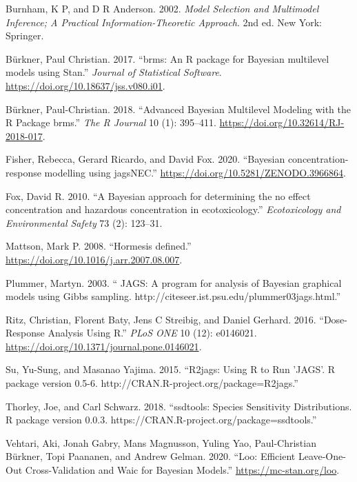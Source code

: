 \documentclass[10pt,a4paper,onecolumn]{article}
\newlength{\cslhangindent}
\newenvironment{cslreferences}%
  {\setlength{\parindent}{0pt}%
  \everypar{\setlength{\hangindent}{\cslhangindent}}\ignorespaces}%
  {\par}
\begin{document}
\hypertarget{refs}{}
\begin{cslreferences}
\leavevmode\hypertarget{ref-Burnham2002}{}%
Burnham, K P, and D R Anderson. 2002. \emph{Model Selection and
Multimodel Inference; A Practical Information-Theoretic Approach}. 2nd
ed. New York: Springer.

\leavevmode\hypertarget{ref-Burkner2017}{}%
Bürkner, Paul Christian. 2017. ``brms: An R package for Bayesian
multilevel models using Stan.'' \emph{Journal of Statistical Software}.
\url{https://doi.org/10.18637/jss.v080.i01}.

\leavevmode\hypertarget{ref-Burkner2018}{}%
Bürkner, Paul-Christian. 2018. ``Advanced Bayesian Multilevel Modeling
with the R Package brms.'' \emph{The R Journal} 10 (1): 395--411.
\url{https://doi.org/10.32614/RJ-2018-017}.

\leavevmode\hypertarget{ref-Fisher2020}{}%
Fisher, Rebecca, Gerard Ricardo, and David Fox. 2020. ``Bayesian
concentration-response modelling using jagsNEC.''
\url{https://doi.org/10.5281/ZENODO.3966864}.

\leavevmode\hypertarget{ref-Fox2010}{}%
Fox, David R. 2010. ``A Bayesian approach for determining the no effect
concentration and hazardous concentration in ecotoxicology.''
\emph{Ecotoxicology and Environmental Safety} 73 (2): 123--31.

\leavevmode\hypertarget{ref-Mattson2008}{}%
Mattson, Mark P. 2008. ``Hormesis defined.''
\url{https://doi.org/10.1016/j.arr.2007.08.007}.

\leavevmode\hypertarget{ref-Plummer2003}{}%
Plummer, Martyn. 2003. `` JAGS: A program for analysis of Bayesian
graphical models using Gibbs sampling.
http://citeseer.ist.psu.edu/plummer03jags.html.''

\leavevmode\hypertarget{ref-Ritz2016}{}%
Ritz, Christian, Florent Baty, Jens C Streibig, and Daniel Gerhard.
2016. ``Dose-Response Analysis Using R.'' \emph{PLoS ONE} 10 (12):
e0146021. \url{https://doi.org/10.1371/journal.pone.0146021}.

\leavevmode\hypertarget{ref-Su2015}{}%
Su, Yu-Sung, and Masanao Yajima. 2015. ``R2jags: Using R to Run 'JAGS'.
R package version 0.5-6. http://CRAN.R-project.org/package=R2jags.''

\leavevmode\hypertarget{ref-Thorley2018}{}%
Thorley, Joe, and Carl Schwarz. 2018. ``ssdtools: Species Sensitivity
Distributions. R package version 0.0.3.
https://CRAN.R-project.org/package=ssdtools.''

\leavevmode\hypertarget{ref-vehtari2020}{}%
Vehtari, Aki, Jonah Gabry, Mans Magnusson, Yuling Yao, Paul-Christian
Bürkner, Topi Paananen, and Andrew Gelman. 2020. ``Loo: Efficient
Leave-One-Out Cross-Validation and Waic for Bayesian Models.''
\url{https://mc-stan.org/loo}.


\end{cslreferences}
\end{document}

